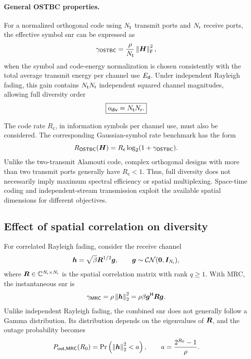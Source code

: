 \paragraph{General OSTBC properties.}
For a normalized orthogonal code using $N_{\mathsf{t}}$ transmit ports and $N_{\mathsf{r}}$ receive ports, the effective symbol \ac{snr} can be expressed as
\begin{equation*}
	\gamma_{\mathsf{OSTBC}}
	=\frac{\rho}{N_{\mathsf{t}}}\left\|\bm{H}\right\|_{\mathsf{F}}^2,
\end{equation*}
when the symbol and code-energy normalization is chosen consistently with the total average transmit energy per channel use $E_{\mathsf{d}}$.
%
Under independent Rayleigh fading, this gain contains $N_{\mathsf{t}}N_{\mathsf{r}}$ independent squared channel magnitudes, allowing full diversity order
\begin{equation*}
	\boxed{o_{\mathsf{div}}=N_{\mathsf{t}}N_{\mathsf{r}}.}
\end{equation*}

The code rate $R_{\mathsf c}$, in information symbols per channel use, must also be considered. The corresponding Gaussian-symbol rate benchmark has the form
\begin{equation*}
	R_{\mathsf{OSTBC}}(\bm{H})
	=R_{\mathsf c}\log_2(1+\gamma_{\mathsf{OSTBC}}).
\end{equation*}
Unlike the two-transmit Alamouti code, complex orthogonal designs with more than two transmit ports generally have $R_{\mathsf c}<1$.
%
Thus, full diversity does not necessarily imply maximum spectral efficiency or spatial multiplexing. Space-time coding and independent-stream transmission exploit the available spatial dimensions for different objectives.



\subsection{Effect of spatial correlation on diversity}

For correlated Rayleigh fading, consider the receive channel
\begin{equation*}
	\bm{h}=\sqrt{\beta}\bm{R}^{1/2}\bm{g},
	\qquad
	\bm{g}\sim\mathcal{CN}(\bm{0},\bm{I}_{N_{\mathsf{r}}}),
\end{equation*}
where $\bm{R}\in\mathbb{C}^{N_{\mathsf{r}}\times N_{\mathsf{r}}}$ is the spatial correlation matrix with rank $q\geq1$.
%
With MRC, the instantaneous \ac{snr} is
\begin{equation*}
	\gamma_{\mathsf{MRC}}
	=\rho\left\|\bm{h}\right\|_2^2
	=\rho\beta{\bm{g}}^{\mathsf{H}}\bm{R}\bm{g}.
\end{equation*}
Unlike independent Rayleigh fading, the combined \ac{snr} does not generally follow a Gamma distribution. Its distribution depends on the eigenvalues of $\bm{R}$, and the outage probability becomes
\begin{equation}\label{eq:corrout}
	P_{\mathsf{out},\mathsf{MRC}}(R_0)
	=\Pr\left(\left\|\bm{h}\right\|_2^2<a\right),
	\qquad
	a=\frac{2^{R_0}-1}{\rho}.
\end{equation}

